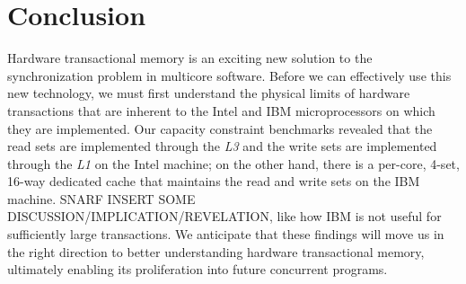 \section{Conclusion}
Hardware transactional memory is an exciting new solution to the synchronization
problem in multicore software. Before we can effectively use this new
technology, we must first understand the physical limits of hardware
transactions that are inherent to the Intel and IBM microprocessors on which
they are implemented. Our capacity constraint benchmarks revealed that the read
sets are implemented through the \textit{L3} and the write sets are implemented
through the \textit{L1} on the Intel machine; on the other hand, there is a
per-core, 4-set, 16-way dedicated cache that maintains the read and write sets
on the IBM machine. SNARF INSERT SOME DISCUSSION/IMPLICATION/REVELATION, like how IBM
is not useful for sufficiently large transactions. We anticipate that these
findings will move us in the right direction to better understanding hardware
transactional memory, ultimately enabling its proliferation into future
concurrent programs.
 
